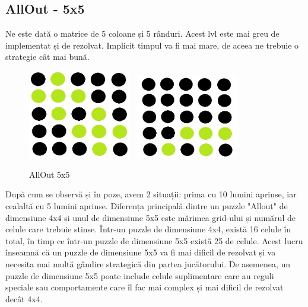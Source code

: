\pagebreak
\subsection{AllOut - 5x5}

\newline
Ne este dată o matrice de 5 coloane și 5 rânduri. Acest lvl este mai greu de implementat și de rezolvat. Implicit timpul va fi mai mare, de aceea ne trebuie o strategie cât mai bună.\newline \newline
  \newline
  \newline
\begin{figure}[h]
\centering
 \includegraphics[width=0.4\textwidth]{text/images/pic4.jpeg}\
  \hfill
  \includegraphics[width=0.4\textwidth]{text/images/pic5.jpeg}\
   \newline
    \caption{AllOut 5x5}
\end{figure} \newline \newline
\newline

\newline \newline După cum se observă și în poze, avem 2 situații: prima cu 10 lumini aprinse, iar cealaltă cu 5 lumini aprinse. \newline\newline
Diferența principală dintre un puzzle "Allout" de dimensiune 4x4 și unul de dimensiune 5x5 este mărimea grid-ului și numărul de celule care trebuie stinse. Într-un puzzle de dimensiune 4x4, există 16 celule în total, în timp ce într-un puzzle de dimensiune 5x5 există 25 de celule. \newline\newline
Acest lucru înseamnă că un puzzle de dimensiune 5x5 va fi mai dificil de rezolvat și va necesita mai multă gândire strategică din partea jucătorului. De asemenea, un puzzle de dimensiune 5x5 poate include celule suplimentare care au reguli speciale sau comportamente care îl fac mai complex și mai dificil de rezolvat decât 4x4.

\pagebreak